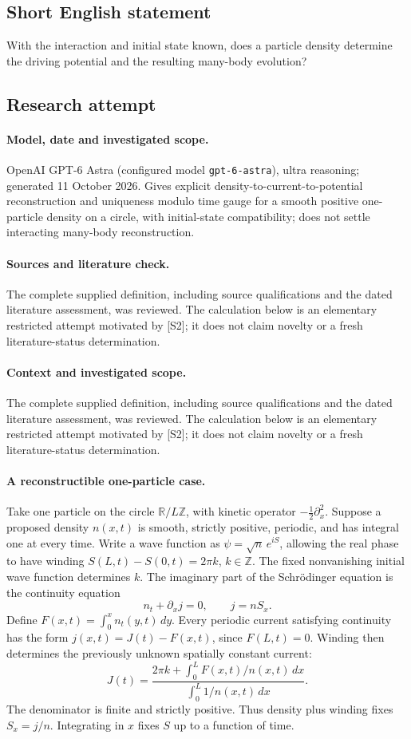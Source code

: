 \documentclass[11pt]{article}
\begin{document}
\subsection{Short English statement}
With the interaction and initial state known, does a particle density determine the driving potential and the resulting many-body evolution?
\subsection{Research attempt}
\paragraph{Model, date and investigated scope.}
OpenAI GPT-6 Astra (configured model \texttt{gpt-6-astra}), ultra reasoning; generated 11 October 2026. Gives explicit density-to-current-to-potential reconstruction and uniqueness modulo time gauge for a smooth positive one-particle density on a circle, with initial-state compatibility; does not settle interacting many-body reconstruction.

\paragraph{Sources and literature check.}
The complete supplied definition, including source qualifications and the dated literature assessment, was reviewed. The calculation below is an elementary restricted attempt motivated by [S2]; it does not claim novelty or a fresh literature-status determination.

\paragraph{Context and investigated scope.} The complete supplied definition, including source qualifications and the dated literature assessment, was reviewed. The calculation below is an elementary restricted attempt motivated by [S2]; it does not claim novelty or a fresh literature-status determination.

\paragraph{A reconstructible one-particle case.}
Take one particle on the circle $\mathbb R/L\mathbb Z$, with kinetic operator $-\tfrac12\partial_x^2$. Suppose a proposed density $n(x,t)$ is smooth, strictly positive, periodic, and has integral one at every time. Write a wave function as $\psi=\sqrt n\,e^{iS}$, allowing the real phase to have winding $S(L,t)-S(0,t)=2\pi k$, $k\in\mathbb Z$. The fixed nonvanishing initial wave function determines $k$.
The imaginary part of the Schr\"odinger equation is the continuity equation
\[
 n_t+\partial_x j=0,\qquad j=nS_x.
\]
Define $F(x,t)=\int_0^x n_t(y,t)\,dy$. Every periodic current satisfying continuity has the form $j(x,t)=J(t)-F(x,t)$, since $F(L,t)=0$. Winding then determines the previously unknown spatially constant current:
\[
 J(t)=\frac{2\pi k+\int_0^L F(x,t)/n(x,t)\,dx}
              {\int_0^L 1/n(x,t)\,dx}.
\]
The denominator is finite and strictly positive. Thus density plus winding fixes $S_x=j/n$. Integrating in $x$ fixes $S$ up to a function of time.
\end{document}
